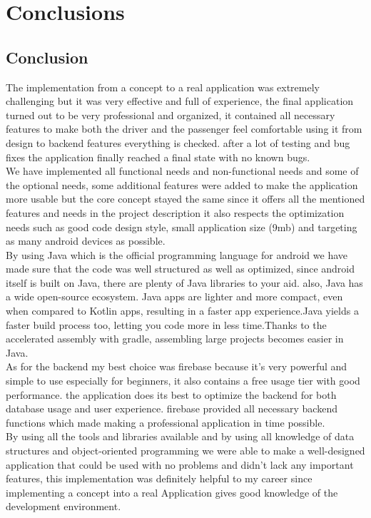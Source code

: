 \chapter{Conclusions}\label{chap:conclusions}

\section{Conclusion}
The implementation from a concept to a real application was extremely challenging but it was very effective and full of experience, the final application turned out to be very professional and organized, it contained all necessary features to make both the driver and the passenger feel comfortable using it from design to backend features everything is checked. after a lot of testing and bug fixes the application finally reached a final state with no known bugs. 
\\  We have implemented all functional needs and non-functional needs and some of the optional needs, some additional features were added to make the application more usable but the core concept stayed the same since it offers all the mentioned features and needs in the project description it also respects the optimization needs such as good code design style, small application size (9mb) and targeting as many android devices as possible.
\\ By using Java which is the official programming language for android we have made sure that the code was well structured as well as optimized, since android itself is built on Java, there are plenty of Java libraries to your aid. also, Java has a wide open-source ecosystem. Java apps are lighter and more compact, even when compared to Kotlin apps, resulting in a faster app experience.Java yields a faster build process too, letting you code more in less time.Thanks to the accelerated assembly with gradle, assembling large projects becomes easier in Java.
\\ As for the backend my best choice was firebase because it’s very powerful and simple to use especially for beginners, it also contains a free usage tier with good performance. the application does its best to optimize the backend for both database usage and user experience. firebase provided all necessary backend functions which made making a professional application in time possible. 
\\  By using all the tools and libraries available and by using all knowledge of data structures and object-oriented programming we were able to make a well-designed application that could be used with no problems and didn’t lack any important features, this implementation was definitely helpful to my career since implementing a concept into a real Application gives good knowledge of the development environment. 

